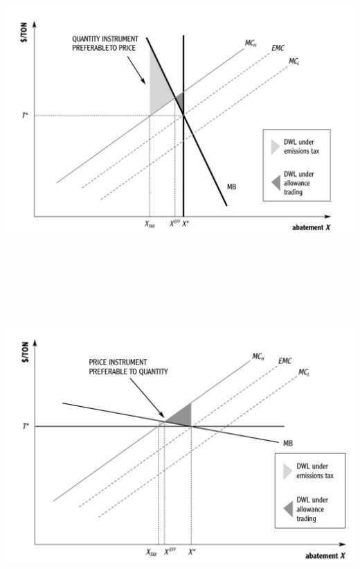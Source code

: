 \begin{frame}{}
\protect\hypertarget{section-23}{}

\includegraphics[width=\textwidth,height=4.6875in]{figures/m4_pvq1.png}

\end{frame}

\begin{frame}{}
\protect\hypertarget{section-24}{}

\includegraphics[width=\textwidth,height=4.6875in]{figures/m4_pvq2.png}

\end{frame}

